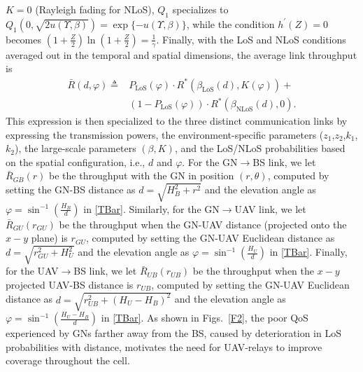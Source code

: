 \documentclass[10pt, twocolumn]{IEEEtran}
\theoremstyle{plain}
\theoremstyle{definition}
\theoremstyle{remark}
\begin{document}
 $K{=}0$ (Rayleigh fading for NLoS), $Q_1$ specializes to $Q_{1}(0,\sqrt{2u(\Upsilon,\beta)}){=}\exp\{-u(\Upsilon,\beta)\}$, while the condition $h^\prime(Z){=}0$ becomes $(1{+}\frac{Z}{2})\ln(1{+}\frac{Z}{2}){=}\frac{1}{\gamma}$. Finally, with the LoS and NLoS conditions averaged out in the temporal and spatial dimensions, the average link throughput is 
\begin{align}\label{TBar}
	\bar{R}(d,\varphi) \triangleq &P_{\mathrm{LoS}}(\varphi) \cdot R^{*}(\beta_{\mathrm{LoS}}(d), K(\varphi)) + \\&(1 - P_{\mathrm{LoS}}(\varphi)) \cdot R^{*}(\beta_{\mathrm{NLoS}}(d), 0).
\end{align}
This expression is then specialized to the three distinct communication links by expressing the transmission powers, the environment-specific parameters ($z_{1}$,$z_{2}$,$k_{1}$,$k_{2}$), the large-scale parameters $(\beta,K)$, and the LoS/NLoS probabilities based on the spatial configuration, i.e., $d$ and $\varphi$. For the GN$\rightarrow$BS link, we let $\bar{R}_{GB}(r)$ be the throughput with the GN in position $(r,\theta)$, computed by setting the GN-BS distance as $d{=}\sqrt{H_{B}^{2}{+}r^{2}}$ and the elevation angle as $\varphi{=}\sin^{-1}\left(\frac{H_{B}}{d}\right)$ in \eqref{TBar}. Similarly, for the GN$\rightarrow$UAV link, we let $\bar{R}_{GU}(r_{GU})$ be the throughput when the GN-UAV distance (projected onto the $x{-}y$ plane) is $r_{GU}$, computed by setting the GN-UAV Euclidean distance as $d{=}\sqrt{r_{GU}^{2}{+}H_{U}^{2}}$ and the elevation angle as $\varphi{=}\sin^{-1}\left(\frac{H_{U}}{d}\right)$ in \eqref{TBar}. Finally, for the UAV$\rightarrow$BS link, we let $\bar{R}_{UB}(r_{UB})$ be the throughput when the $x{-}y$ projected UAV-BS distance is $r_{UB}$, computed by setting the GN-UAV Euclidean distance as $d{=}\sqrt{r_{UB}^{2}{+}(H_{U}{-}H_{B})^{2}}$ and the elevation angle as $\varphi{=}\sin^{-1}\left(\frac{H_{U}{-}H_{B}}{d}\right)$ in \eqref{TBar}. As shown in Figs.~\ref{F2}, the poor QoS experienced by GNs farther away from the BS, caused by deterioration in LoS probabilities with distance, motivates the need for UAV-relays to improve coverage throughout the cell.
\end{document}
